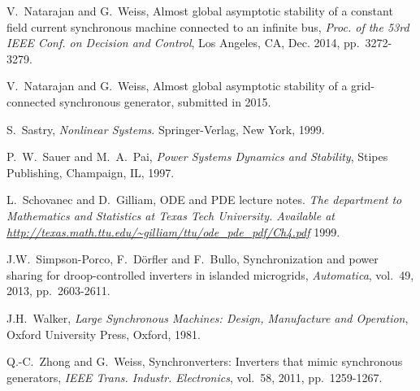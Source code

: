 \documentclass[letterpaper, 10 pt, conference]{ieeeconf}
\newcommand{\m}      {{\hbox{\hskip 1pt}}}
\begin{document}
\begin{thebibliography}{99}
 V.~Natarajan and G.~Weiss, \m Almost global 
 asymptotic stability of a constant field current synchronous 
 machine connected to an infinite bus, {\em Proc. of the 53rd 
 IEEE Conf. on Decision and Control}, Los Angeles, CA, Dec. 2014, 
 pp.~3272-3279.

 V.~Natarajan and G.~Weiss, \m Almost global 
 asymptotic stability of a grid-connected synchronous generator,
 submitted in 2015.

 S.~Sastry, \m \emph{Nonlinear Systems}.
 Springer-Verlag, New York, 1999.

 P.~W.~Sauer and M.~A.~Pai, \m {\em Power 
 Systems Dynamics and Stability}, Stipes Publishing, Champaign,
 IL, 1997.

 L.~Schovanec and D.~Gilliam, \m ODE
 and PDE lecture notes. {\em The department to Mathematics and 
 Statistics at Texas Tech University. Available at
 \url{http://texas.math.ttu.edu/~gilliam/ttu/ode_pde_pdf/Ch4.pdf} }
 \m 1999.

 J.W.~Simpson-Porco, F.~D{\"o}rfler
 and F.~Bullo, \m Synchronization and power sharing for
 droop-controlled inverters in islanded microgrids, {\em 
 Automatica}, vol.~49, 2013, pp.~2603-2611.

 J.H.~Walker, \m {\em Large Synchronous Machines: 
 Design, Manufacture and Operation}, \m Oxford University Press, 
 Oxford, 1981.

 Q.-C.~Zhong and G.~Weiss, \m Synchronverters: 
 Inverters that mimic synchronous generators, {\em IEEE Trans. 
 Industr. Electronics}, vol.~58, 2011, pp.~1259-1267.

\end{thebibliography}
\end{document}
